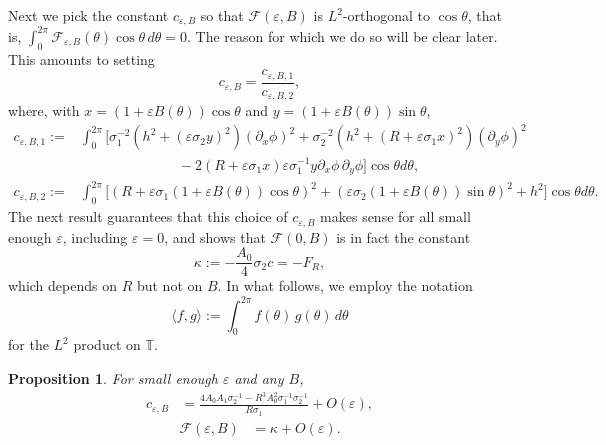 \documentclass[12pt,reqno]{amsart}
\numberwithin{equation}{section}
\newtheorem{proposition}[theorem]{Proposition}
\theoremstyle{definition}
\theoremstyle{remark}
\newtheorem{remark}[theorem]{Remark}
\begin{document}
Next we pick the constant $c_{\varepsilon,B}$ so that $\mathcal{F}(\varepsilon,B)$ is $L^2$-orthogonal to $\cos\theta$, that is, $ \int_0^{2\pi}\mathcal F_{\varepsilon,B}(\theta)\cos\theta\, d\theta=0 $.
The reason for which we do so will be clear later.
This amounts to setting
\begin{equation}\label{eq:Ceps-expression}
c_{\varepsilon,B}=\frac{c_{\varepsilon,B,1}}{c_{\varepsilon,B,2}},
\end{equation}
where, with $x=(1+\varepsilon B(\theta))\cos\theta$ and $y=(1+\varepsilon B(\theta))\sin\theta$,
\begin{equation*}%
\begin{aligned}
c_{\varepsilon,B,1}:={}&\int_0^{2\pi}\Big[\sigma_1^{-2}(h^2+(\varepsilon\sigma_2y)^2)(\partial_x\phi)^2
+\sigma_2^{-2}(h^2+(R+\varepsilon\sigma_1x)^2)(\partial_y\phi)^2\\
&\hspace{7em}-2(R+\varepsilon\sigma_1x)\varepsilon\sigma_1^{-1}y\partial_x\phi\,\partial_y\phi\Big]\cos\theta d\theta,\\
c_{\varepsilon,B,2}:={}&\int_0^{2\pi}\Big[(R+\varepsilon\sigma_1(1+\varepsilon B(\theta))\cos\theta)^2
+(\varepsilon\sigma_2(1+\varepsilon B(\theta))\sin\theta)^2+h^2\Big]\cos\theta d\theta.
\end{aligned}
\end{equation*}
	The next result guarantees that this choice of $c_{\varepsilon,B}$ makes sense for all small enough $\varepsilon$, including $\varepsilon=0$, and shows that $\mathcal{F}(0,B)$ is in fact the constant
\[
\kappa :=-\frac{A_0}{4}\sigma_2c=-F_R,
\]
which depends on $R$ but not on $B$.
In what follows, we employ the notation
\[
\langle f, g\rangle := \int_0^{2\pi} f(\theta)\,g(\theta)\,d\theta
\]
for the $L^2$ product on $\mathbb{T}$.

\begin{proposition}\label{prop:F_expansion}
	For small enough $\varepsilon$ and any $B$,
\begin{align*} 
c_{\varepsilon,B} &=\frac{4A_0A_1\sigma_2^{-1}-R^3A_0^2\sigma_1^{-1}\sigma_2^{-1}}{R\sigma_1}+O(\varepsilon),
\end{align*}
 \begin{align*} 
 \mathcal{F}(\varepsilon,B)& = \kappa + O(\varepsilon).
 \end{align*}
 
\end{proposition}
\end{document}
